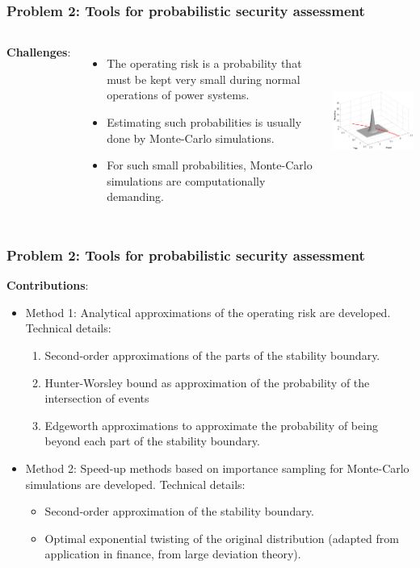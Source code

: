 \documentclass{beamer}
\begin{document}
\begin{frame}
  \frametitle{Problem 2: Tools for probabilistic security assessment}
  \begin{columns}
\textbf{Challenges}:
\begin{itemize}
\item The operating risk is a probability that must be kept very small during normal operations of power systems.
\item Estimating such probabilities is usually done by Monte-Carlo simulations.
\item For such small probabilities, Monte-Carlo simulations are computationally demanding.
\end{itemize}
\includegraphics[height=5cm,width=1\textwidth]{Figs/KarysStbBdAndForcast3D-1}
  \end{columns}
\end{frame}

\begin{frame}
  \frametitle{Problem 2: Tools for probabilistic security assessment}
  \textbf{Contributions}:
  \begin{itemize}
  \item Method 1: Analytical approximations of the operating risk are developed. Technical details:
    \begin{enumerate}
    \item Second-order approximations of the parts of the stability boundary.
    \item Hunter-Worsley bound as approximation of the probability of the intersection of events
    \item Edgeworth approximations to approximate the probability of being beyond each part of the stability boundary.
    \end{enumerate}
  \item Method 2: Speed-up methods based on importance sampling for Monte-Carlo simulations are developed. Technical details:
    \begin{itemize}
    \item Second-order approximation of the stability boundary.
    \item Optimal exponential twisting of the original distribution (adapted from application in finance, from large deviation theory).
    \end{itemize}
  \end{itemize}
\end{frame}
\end{document}
